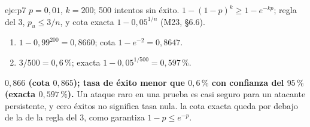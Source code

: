 \begin{solucion}{eje:p7}
\datos $p=0{,}01$, $k=200$; 500 intentos sin éxito.
\planteamiento $1-(1-p)^{k}\ge 1-e^{-kp}$; regla del 3, $p_u\le 3/n$, y cota exacta $1-0{,}05^{1/n}$ (M23, §6.6).
\pasos
\begin{enumerate}[label=\arabic*.]
  \item $1-0{,}99^{200}=0{,}8660$; cota $1-e^{-2}=0{,}8647$.
  \item $3/500=0{,}6\,\%$; exacta $1-0{,}05^{1/500}=0{,}597\,\%$.
\end{enumerate}
\resultado \textbf{$0{,}866$ (cota $0{,}865$); tasa de éxito menor que $0{,}6\,\%$ con confianza del $95\,\%$ (exacta $0{,}597\,\%$).} Un ataque raro en una prueba es casi seguro para un atacante persistente, y cero éxitos no significa tasa nula.
\comprobacion la cota exacta queda por debajo de la de la regla del 3, como garantiza $1-p\le e^{-p}$.
\end{solucion}
